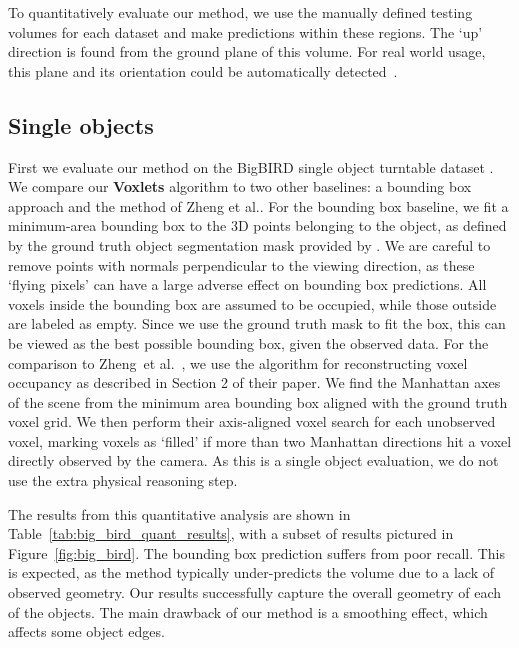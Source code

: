 \documentclass[10pt,twocolumn,letterpaper]{article}
\makeatletter
\newcommand*{\ea}{et al.\@\xspace}
\makeatother
\begin{document}
To quantitatively evaluate our method, we use the manually defined testing volumes for each dataset and make predictions within these regions.
The `up' direction is found from the ground plane of this volume.
For real world usage, this plane and its orientation could be automatically detected~\cite{silberman-eccv-2012}.

%


\subsection{Single objects}
First we evaluate our method on the BigBIRD single object turntable dataset \cite{singh-icra-2014}.
We compare our {\bf Voxlets} algorithm to two other baselines: a bounding box approach and the method of Zheng \ea \cite{zheng-cvpr-2013}.
For the bounding box baseline, we fit a minimum-area bounding box to the 3D points belonging to the object, as defined by the ground truth object segmentation mask provided by \cite{singh-icra-2014}.
We are careful to remove points with normals perpendicular to the viewing direction, as these `flying pixels' can have a large adverse effect on bounding box predictions.
All voxels inside the bounding box are assumed to be occupied, while those outside are labeled as empty.
Since we use the ground truth mask to fit the box, this can be viewed as the best possible bounding box, given the observed data.
For the comparison to Zheng~\ea~\cite{zheng-cvpr-2013}, we use the algorithm for reconstructing voxel occupancy as described in Section 2 of their paper.
We find the Manhattan axes of the scene from the minimum area bounding box aligned with the ground truth voxel grid.
We then perform their axis-aligned voxel search for each unobserved voxel, marking voxels as ‘filled’ if more than two Manhattan directions hit a voxel directly observed by the camera.
As this is a single object evaluation, we do not use the extra physical reasoning step.

The results from this quantitative analysis are shown in Table~\ref{tab:big_bird_quant_results}, with a subset of results pictured in Figure~\ref{fig:big_bird}.
The bounding box prediction suffers from poor recall.
This is expected, as the method typically under-predicts the volume due to a lack of observed geometry.
Our results successfully capture the overall geometry of each of the objects.
The main drawback of our method is a smoothing effect, which affects some object edges.
\end{document}
